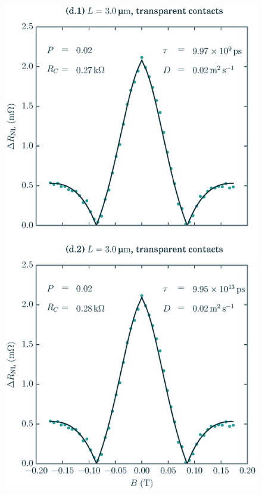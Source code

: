 \begin{figure}[!b]
  \includegraphics[width=\columnwidth]{figures/plot_fits_large_lifetime}
\end{figure}

